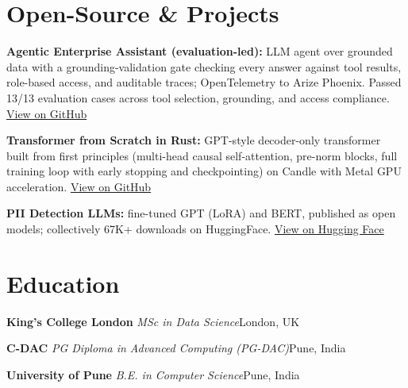 \documentclass[10pt,a4paper]{article}
\newcommand{\sep}{\,\textcolor{accent!60}{\textbar}\,}
\begin{document}
\section{Open-Source \& Projects}
\begin{tight}
  \item \textbf{Agentic Enterprise Assistant (evaluation-led):} LLM agent over grounded data with a grounding-validation gate checking every answer against tool results, role-based access, and auditable traces; OpenTelemetry to Arize Phoenix. Passed 13/13 evaluation cases across tool selection, grounding, and access compliance. \href{https://github.com/abhijeetscode/Agentic-Enterprise-Assistant}{View on GitHub}
  \item \textbf{Transformer from Scratch in Rust:} GPT-style decoder-only transformer built from first principles (multi-head causal self-attention, pre-norm blocks, full training loop with early stopping and checkpointing) on Candle with Metal GPU acceleration. \href{https://github.com/abhijeetscode/transformer-rust}{View on GitHub}
  \item \textbf{PII Detection LLMs:} fine-tuned GPT (LoRA) and BERT, published as open models; collectively 67K+ downloads on HuggingFace. \href{https://huggingface.co/ab-ai/pii_model}{View on Hugging Face}
\end{tight}

\section{Education}
{\color{company}\bfseries King's College London}\sep{\itshape MSc in Data Science}\hfill {\color{muted}London, UK}\par\vspace{1pt}
{\color{company}\bfseries C-DAC}\sep{\itshape PG Diploma in Advanced Computing (PG-DAC)}\hfill {\color{muted}Pune, India}\par\vspace{1pt}
{\color{company}\bfseries University of Pune}\sep{\itshape B.E. in Computer Science}\hfill {\color{muted}Pune, India}\par
\end{document}
